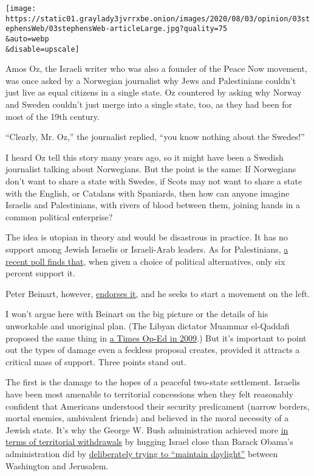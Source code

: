 \texttt{[image: https://static01.graylady3jvrrxbe.onion/images/2020/08/03/opinion/03stephensWeb/03stephensWeb-articleLarge.jpg?quality=75\\\&auto=webp\\\&disable=upscale]}

Amos Oz, the Israeli writer who was also a founder of the Peace Now
movement, was once asked by a Norwegian journalist why Jews and
Palestinians couldn't just live as equal citizens in a single state. Oz
countered by asking why Norway and Sweden couldn't just merge into a
single state, too, as they had been for most of the 19th century.

``Clearly, Mr. Oz,'' the journalist replied, ``you know nothing about
the Swedes!''

I heard Oz tell this story many years ago, so it might have been a
Swedish journalist talking about Norwegians. But the point is the same:
If Norwegians don't want to share a state with Swedes, if Scots may not
want to share a state with the English, or Catalans with Spaniards, then
how can anyone imagine Israelis and Palestinians, with rivers of blood
between them, joining hands in a common political enterprise?

The idea is utopian in theory and would be disastrous in practice. It
has no support among Jewish Israelis or Israeli-Arab leaders. As for
Palestinians,
\href{http://pcpsr.org/sites/default/files/Poll\%2076\%20English\%20press\%20release\%20\%D9\%8D_June\%202020.pdf}{a
recent poll finds that}, when given a choice of political alternatives,
only six percent support it.

Peter Beinart, however,
\href{https://www.nytimes3xbfgragh.onion/2020/07/08/opinion/israel-annexation-two-state-solution.html}{endorses
it,} and he seeks to start a movement on the left.

I won't argue here with Beinart on the big picture or the details of his
unworkable and unoriginal plan. (The Libyan dictator Muammar el-Qaddafi
proposed the same thing in
\href{https://www.nytimes3xbfgragh.onion/2009/01/22/opinion/22qaddafi.html}{a
Times Op-Ed in 2009}.) But it's important to point out the types of
damage even a feckless proposal creates, provided it attracts a critical
mass of support. Three points stand out.

The first is the damage to the hopes of a peaceful two-state settlement.
Israelis have been most amenable to territorial concessions when they
felt reasonably confident that Americans understood their security
predicament (narrow borders, mortal enemies, ambivalent friends) and
believed in the moral necessity of a Jewish state. It's why the George
W. Bush administration achieved more
\href{https://www.nytimes3xbfgragh.onion/2005/08/14/nyregion/pain-of-israels-withdrawal-from-gaza-strip-is-felt-by-american.html}{in
terms of territorial withdrawals} by hugging Israel close than Barack
Obama's administration did by
\href{https://www.wsj.com/articles/how-obama-abandoned-israel-1434409772}{deliberately
trying to ``maintain daylight''} between Washington and Jerusalem.

